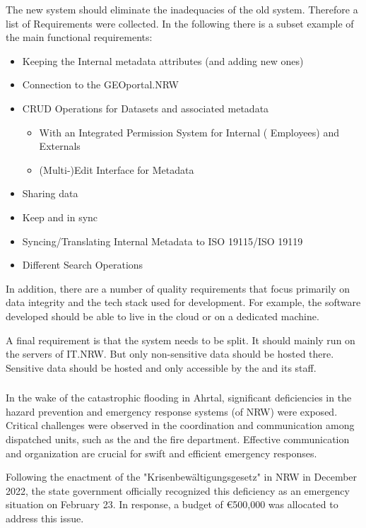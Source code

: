 \documentclass[11pt, titlepage, a4paper]{article}
\begin{document}
The new system should eliminate the inadequacies of the old system. Therefore a list of Requirements were collected. In the following there is a subset example of the main functional requirements:
\begin{itemize}
    \item Keeping the Internal metadata attributes (and adding new ones)
    \item Connection to the GEOportal.NRW
    \item CRUD Operations for Datasets and associated metadata
          \begin{itemize}
              \item With an Integrated Permission System for Internal ( Employees) and Externals
              \item (Multi-)Edit Interface for Metadata
          \end{itemize}
    \item Sharing data
    \item Keep  and  in sync
    \item Syncing/Translating Internal Metadata to ISO 19115/ISO 19119
    \item Different Search Operations
\end{itemize}

In addition, there are a number of quality requirements that focus primarily on data integrity and the tech stack used for development. For example, the software developed should be able to live in the cloud or on a dedicated machine.

A final requirement is that the system needs to be split. It should mainly run on the servers of IT.NRW. But only non-sensitive data should be hosted there. Sensitive data should be hosted and only accessible by the  and its staff.
\subsubsection{}
In the wake of the catastrophic flooding in Ahrtal, significant deficiencies in the hazard prevention and emergency response systems (of NRW) were exposed. Critical challenges were observed in the coordination and communication among dispatched units, such as the   and the fire department. Effective communication and organization are crucial for swift and efficient emergency responses.

Following the enactment of the "Krisenbewältigungsgesetz" in NRW in December 2022, the state government officially recognized this deficiency as an emergency situation on February 23. In response, a budget of €500,000 was allocated to address this issue.
\end{document}
